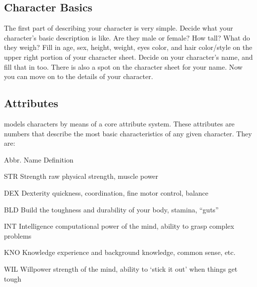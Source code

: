 \documentclass[twoside]{book}
\begin{document}
\subsection{Character Basics}
     The first part of describing your character is very
               simple. Decide what your character’s basic
               description is like. Are they male or female? How tall?
               What do they weigh? Fill in age, sex, height, weight, eyes
               color, and hair color/style on the upper right portion of
               your character sheet. Decide on your character’s
               name, and fill that in too. There is also a spot on the
               character sheet for your name. Now you can move on to the
               details of your character. 
\subsection{Attributes}
    \APATHY{}  models characters by means of a core
              attribute system. These attributes are numbers that
              describe the most basic characteristics of any given
              character. They are:
              
                
                  
                   Abbr.   
                   Name   
                   Definition   
                  
                  
                   STR   
                   Strength   
                   raw physical strength, muscle power   
                  
                  
                   DEX   
                   Dexterity   
                     quickness, coordination, fine motor control,
                     balance 
                  
                  
                   BLD   
                   Build   
                     the toughness and durability of your body,
                     stamina, “guts” 
                  
                  
                   INT   
                   Intelligence   
                     computational power of the mind, ability to
                     grasp complex problems 
                  
                  
                   KNO   
                   Knowledge   
                     experience and background knowledge, common
                     sense, etc. 
                  
                  
                   WIL   
                   Willpower   
                     strength of the mind, ability to ‘stick
                     it out’ when things get tough 
                  
\end{document}
